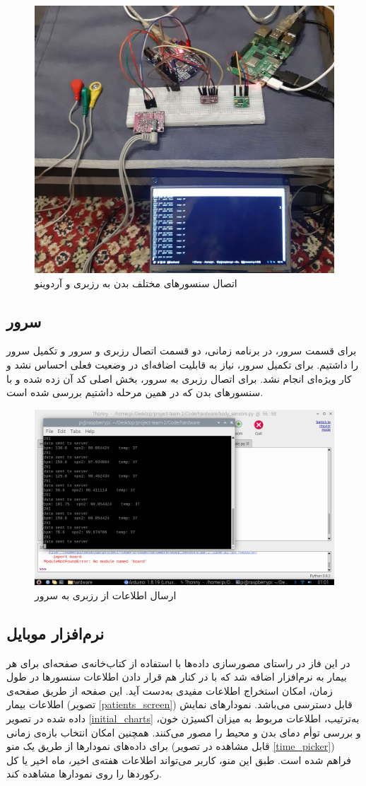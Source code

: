 \documentclass[12pt]{article}
\begin{document}
\begin{figure}[H]
	\begin{center}
		\includegraphics[width=.45\textwidth]{images/all.jpg}
	\end{center}
	\caption{اتصال سنسورهای مختلف بدن به رزبری و آردوینو}
\end{figure}


\subsection{سرور}

برای قسمت سرور، در برنامه زمانی، دو قسمت اتصال رزبری و سرور و تکمیل سرور را داشتیم. برای تکمیل سرور، نیاز به قابلیت اضافه‌ای در وضعیت فعلی احساس نشد و کار ویژه‌ای انجام نشد. برای اتصال رزبری به سرور، بخش اصلی کد آن زده شده و با سنسور‌های بدن که در همین مرحله داشتیم بررسی شده است.


\begin{figure}[H]
	\begin{center}
		\includegraphics[width=.60\textwidth]{images/server.png}
	\end{center}
	\caption{ارسال اطلاعات از رزبری به سرور}
\end{figure}


\subsection{نرم‌افزار موبایل}
در این فاز در راستای مصورسازی داده‌ها با استفاده از کتاب‌خانه‌ی  صفحه‌ای برای هر بیمار به نرم‌افزار اضافه شد که با در کنار هم قرار دادن اطلاعات سنسورها در طول زمان، امکان استخراج اطلاعات مفیدی به‌دست آید. این صفحه از طریق صفحه‌ی اطلاعات بیمار (تصویر \ref{patients_screen}) قابل دسترسی می‌باشد. نمودارهای نمایش داده شده در تصویر
\ref{initial_charts}
به‌ترتیب، اطلاعات مربوط به میزان اکسیژن خون، و بررسی توأم دمای بدن و محیط را مصور می‌کنند. همچنین امکان انتخاب بازه‌ی زمانی برای داده‌های نمودارها از طریق یک منو (قابل مشاهده در تصویر \ref{time_picker}) فراهم شده است. طبق این منو، کاربر می‌تواند اطلاعات هفته‌ی اخیر، ماه اخیر یا کل رکوردها را روی نمودارها مشاهده کند.
\end{document}
